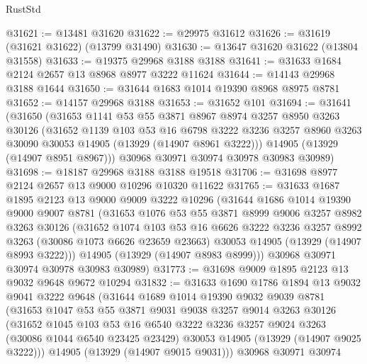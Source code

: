 \begin{lexlean}{RustStd}
\begin{coremodule}
@31621 := @13481 @31620
@31622 := @29975 @31612
@31626 := @31619 (@31621 @31622) (@13799 @31490)
@31630 := @13647 @31620 @31622 (@13804 @31558)
@31633 := @19375 @29968 @3188 @3188
@31641 := @31633 @1684 @2124 @2657 @13 @8968 @8977 @3222 @11624
@31644 := @14143 @29968 @3188 @1644
@31650 := @31644 @1683 @1014 @19390 @8968 @8975 @8781
@31652 := @14157 @29968 @3188
@31653 := @31652 @101
@31694 := @31641
    (@31650
      (@31653
        @1141
        @53
        @55
        @3871
        @8967
        @8974
        @3257
        @8950
        @3263
        @30126
        (@31652
          @1139
          @103
          @53
          @16
          @6798
          @3222
          @3236
          @3257
          @8960
          @3263
          @30090
          @30053
          @14905
          (@13929 (@14907 @8961 @3222)))
        @14905
        (@13929 (@14907 @8951 @8967)))
      @30968
      @30971
      @30974
      @30978
      @30983
      @30989)
@31698 := @18187 @29968 @3188 @3188 @19518
@31706 := @31698 @8977 @2124 @2657 @13 @9000 @10296 @10320 @11622
@31765 := @31633
    @1687
    @1895
    @2123
    @13
    @9000
    @9009
    @3222
    @10296
    (@31644
      @1686
      @1014
      @19390
      @9000
      @9007
      @8781
      (@31653
        @1076
        @53
        @55
        @3871
        @8999
        @9006
        @3257
        @8982
        @3263
        @30126
        (@31652
          @1074
          @103
          @53
          @16
          @6626
          @3222
          @3236
          @3257
          @8992
          @3263
          (@30086 @1073 @6626 @23659 @23663)
          @30053
          @14905
          (@13929 (@14907 @8993 @3222)))
        @14905
        (@13929 (@14907 @8983 @8999)))
      @30968
      @30971
      @30974
      @30978
      @30983
      @30989)
@31773 := @31698 @9009 @1895 @2123 @13 @9032 @9648 @9672 @10294
@31832 := @31633
    @1690
    @1786
    @1894
    @13
    @9032
    @9041
    @3222
    @9648
    (@31644
      @1689
      @1014
      @19390
      @9032
      @9039
      @8781
      (@31653
        @1047
        @53
        @55
        @3871
        @9031
        @9038
        @3257
        @9014
        @3263
        @30126
        (@31652
          @1045
          @103
          @53
          @16
          @6540
          @3222
          @3236
          @3257
          @9024
          @3263
          (@30086 @1044 @6540 @23425 @23429)
          @30053
          @14905
          (@13929 (@14907 @9025 @3222)))
        @14905
        (@13929 (@14907 @9015 @9031)))
      @30968
      @30971
      @30974

\end{coremodule}
\end{lexlean}
